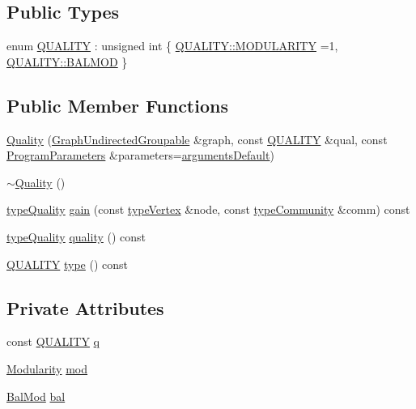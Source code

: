 \subsection*{Public Types}
\begin{DoxyCompactItemize}
\item 
enum \hyperlink{classQuality_ada8fae04627fbcaa8d41a1d42ae124df}{Q\+U\+A\+L\+I\+TY} \+: unsigned int \{ \hyperlink{classQuality_ada8fae04627fbcaa8d41a1d42ae124dfa2a7d416fbe43baf234420601ea73d946}{Q\+U\+A\+L\+I\+T\+Y\+::\+M\+O\+D\+U\+L\+A\+R\+I\+TY} =1, 
\hyperlink{classQuality_ada8fae04627fbcaa8d41a1d42ae124dfa2ca6c7acaa036f0d3b18d83b688b2df9}{Q\+U\+A\+L\+I\+T\+Y\+::\+B\+A\+L\+M\+OD}
 \}
\end{DoxyCompactItemize}
\subsection*{Public Member Functions}
\begin{DoxyCompactItemize}
\item 
\hyperlink{classQuality_aaf6c17096575e026401ccdc252b69c90}{Quality} (\hyperlink{classGraphUndirectedGroupable}{Graph\+Undirected\+Groupable} \&graph, const \hyperlink{classQuality_ada8fae04627fbcaa8d41a1d42ae124df}{Q\+U\+A\+L\+I\+TY} \&qual, const \hyperlink{structProgramParameters}{Program\+Parameters} \&parameters=\hyperlink{program_8h_ae2d819404495f80f31db7676c1329d19}{arguments\+Default})
\item 
\hyperlink{classQuality_af324bc7935b5f9fb997dc6de32e0bd78}{$\sim$\+Quality} ()
\item 
\hyperlink{qualityInterface_8h_a15a3ec6041e6e02d00d2eff22c20fd94}{type\+Quality} \hyperlink{classQuality_a1754dc190ca3204035d873c4d4b580cd}{gain} (const \hyperlink{edge_8h_a5fbd20c46956d479cb10afc9855223f6}{type\+Vertex} \&node, const \hyperlink{graphUndirectedGroupable_8h_a914da95c9ea7f14f4b7f875c36818556}{type\+Community} \&comm) const
\item 
\hyperlink{qualityInterface_8h_a15a3ec6041e6e02d00d2eff22c20fd94}{type\+Quality} \hyperlink{classQuality_a9a6141e9247bc85177f9fe662ec4d14a}{quality} () const
\item 
\hyperlink{classQuality_ada8fae04627fbcaa8d41a1d42ae124df}{Q\+U\+A\+L\+I\+TY} \hyperlink{classQuality_a08b9760ee655eff3a38bec27420c2955}{type} () const
\end{DoxyCompactItemize}
\subsection*{Private Attributes}
\begin{DoxyCompactItemize}
\item 
const \hyperlink{classQuality_ada8fae04627fbcaa8d41a1d42ae124df}{Q\+U\+A\+L\+I\+TY} \hyperlink{classQuality_ae709d894bf1d5e932f8cfde708811a45}{q}
\item 
\hyperlink{classModularity}{Modularity} \hyperlink{classQuality_a04fbfc618c695be31fd4340cac3982b5}{mod}
\item 
\hyperlink{classBalMod}{Bal\+Mod} \hyperlink{classQuality_a8fc813090a5cba20fac1936878627110}{bal}
\end{DoxyCompactItemize}


